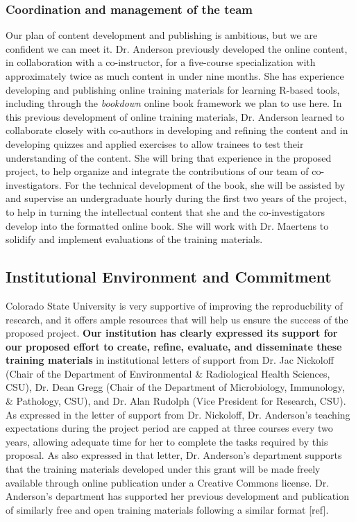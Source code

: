 \documentclass[pdftex,english,11pt,parskip=half]{scrartcl}
\begin{document}
\subsubsection*{Coordination and management of the team}



Our plan of content development and publishing is ambitious, but we are
confident we can meet it. Dr. Anderson previously developed the online content,
in collaboration with a co-instructor, for a five-course specialization with
approximately twice as much content in under nine months. She has experience
developing and publishing online training materials for learning R-based tools,
including through the \textit{bookdown} online book framework we plan to use
here. In this previous development of online training materials, Dr. Anderson
learned to collaborate closely with co-authors in developing and refining the
content and in developing quizzes and applied exercises to allow trainees to
test their understanding of the content. She will bring that experience in the
proposed project, to help organize and integrate the contributions of our team
of co-investigators. For the technical development of the book, she will be
assisted by and supervise an undergraduate hourly during the first two years of
the project, to help in turning the intellectual content that she and the
co-investigators develop into the formatted online book. She will work with Dr.
Maertens to solidify and implement evaluations of the training materials.

\subsection{Institutional Environment and Commitment}

Colorado State University is very supportive of improving the reproducbility of
research, and it offers ample resources that will help us ensure the success of
the proposed project. \textbf{Our institution has clearly expressed its support
for our proposed effort to create, refine, evaluate, and disseminate these
training materials} in institutional letters of support from Dr. Jac Nickoloff
(Chair of the Department of Environmental \& Radiological Health Sciences, CSU),
Dr. Dean Gregg (Chair of the Department of Microbiology, Immunology, \&
Pathology, CSU), and Dr. Alan Rudolph (Vice President for Research, CSU). As
expressed in the letter of support from Dr. Nickoloff, Dr. Anderson's teaching
expectations during the project period are capped at three courses every two
years, allowing adequate time for her to complete the tasks required by this
proposal. As also expressed in that letter, Dr. Anderson's department supports
that the training materials developed under this grant will be made freely
available through online publication under a Creative Commons license. Dr.
Anderson's department has supported her previous development and publication of
similarly free and open training materials following a similar format [ref].
\end{document}
